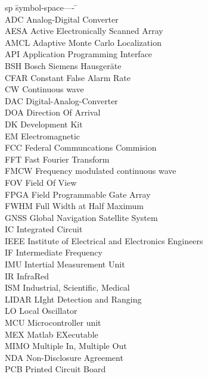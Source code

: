 \begin{listofabbrevs}
\begin{tabbing}

sp	\= symbol-space---- \= \kill \+ \\

ADC \> Analog-Digital Converter \\
AESA \> Active Electronically Scanned Array \\
AMCL \> Adaptive Monte Carlo Localization \\
API \> Application Programming Interface \\
BSH \> Bosch Siemens Hausgeräte \\
CFAR \> Constant False Alarm Rate \\
CW \> Continuous wave \\
DAC \> Digital-Analog-Converter \\
DOA \> Direction Of Arrival \\
DK \> Development Kit \\
EM \> Electromagnetic \\
FCC \> Federal Communcations Commision \\
FFT \> Fast Fourier Transform \\
FMCW \> Frequency modulated continuous wave \\
FOV \> Field Of View \\
FPGA \> Field Programmable Gate Array \\
FWHM \> Full Width at Half Maximum \\
GNSS \> Global Navigation Satellite System \\
IC \> Integrated Circuit \\
IEEE \> Institute of Electrical and Electronics Engineers \\
IF \> Intermediate Frequency \\
IMU \> Intertial Measurement Unit \\
IR \> InfraRed \\
ISM \> Industrial, Scientific, Medical \\
LIDAR \> LIght Detection and Ranging \\
LO \> Local Oscillator \\
MCU \> Microcontroller unit \\
MEX \> Matlab EXecutable \\
MIMO \> Multiple In, Multiple Out \\
NDA \> Non-Disclosure Agreement \\
PCB \> Printed Circuit Board \\

\end{tabbing}
\end{listofabbrevs}
